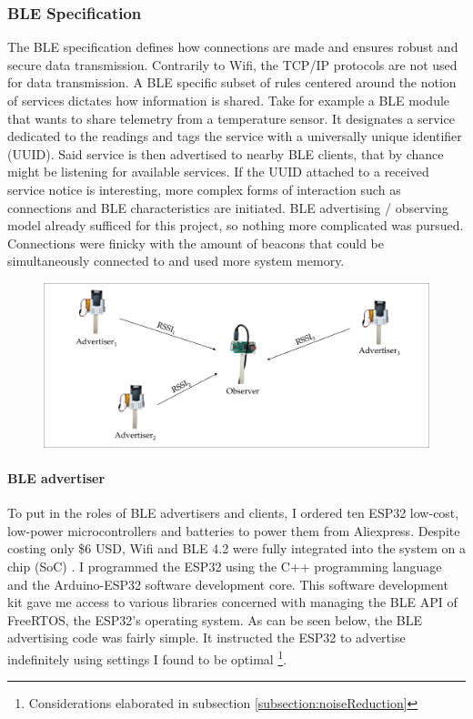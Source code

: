 \documentclass[a4paper, oneside]{ipsreport}
\begin{document}
\subsubsection{BLE Specification}
The BLE specification defines how connections are made and ensures robust and secure data transmission. Contrarily to Wifi, the TCP/IP protocols are not used for data transmission. A BLE specific subset of rules centered around the notion of services dictates how information is shared. Take for example a BLE module that wants to share telemetry from a temperature sensor. It designates a service dedicated to the readings and tags the service with a universally unique identifier (UUID). Said service is then advertised to nearby BLE clients, that by chance might be listening for available services. If the UUID attached to a received service notice is interesting, more complex forms of interaction such as connections and BLE characteristics are initiated. BLE advertising / observing model already sufficed for this project, so nothing more complicated was pursued. Connections were finicky with the amount of beacons that could be simultaneously connected to and used more system memory.

\begin{figure}[h]
	\centering
	\includegraphics[width=\linewidth]{./figures/ble-advertiser-observer.pdf}
	\label{fig:ble-advertiser-observer}
\end{figure}

\paragraph{BLE advertiser}
To put in the roles of BLE advertisers and clients, I ordered ten ESP32 low-cost, low-power microcontrollers and batteries to power them from Aliexpress. Despite costing only \$6 USD, Wifi and BLE 4.2 were fully integrated into the system on a chip (SoC) \autocite{TtgoTdisplay}. I programmed the ESP32 using the C++ programming language and the Arduino-ESP32 software development core. This software development kit gave me access to various libraries concerned with managing the BLE API of FreeRTOS, the ESP32's operating system. As can be seen below, the BLE advertising code was fairly simple. It instructed the ESP32 to advertise indefinitely using settings I found to be optimal \footnote{Considerations elaborated in subsection \ref{subsection:noiseReduction}}.
\end{document}
